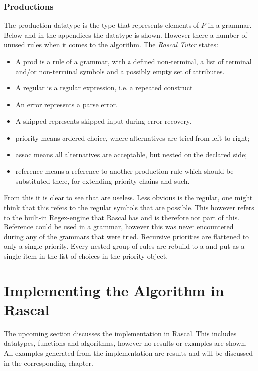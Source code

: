 \subsubsection{Productions}
The production datatype is the type that represents elements of $P$ in a grammar. Below and in the appendices the datatype is shown. However there a number of unused rules when it comes to the algorithm. The \textit{Rascal Tutor} states:
\begin{itemize}
\item A prod is a rule of a grammar, with a defined non-terminal, a list of terminal and/or non-terminal symbols and a possibly empty set of attributes.
\item A regular is a regular expression, i.e. a repeated construct.
\item An error represents a parse error.
\item A skipped represents skipped input during error recovery.
\item priority means ordered choice, where alternatives are tried from left to right;
\item assoc means all alternatives are acceptable, but nested on the declared side;
\item reference means a reference to another production rule which should be substituted there, for extending priority chains and such.
\end{itemize}
From this it is clear to see that  are useless. Less obvious is the regular, one might think that this refers to the regular symbols that are possible. This however refers to the built-in Regex-engine that Rascal has and is therefore not part of this. Reference could be used in a grammar, however this was never encountered during any of the grammars that were tried. Recursive priorities are flattened to only a single priority. Every nested group of rules are rebuild to a \data{\\choice()} and put as a single item in the list of choices in the priority object.


\pagebreak

\section{Implementing the Algorithm in Rascal} \label{sec:RascalAlgorithm}
The upcoming section discusses the implementation in Rascal. This includes datatypes, functions and algorithms, however no results or examples are shown. All examples generated from the implementation are results and will be discussed in the corresponding chapter.
